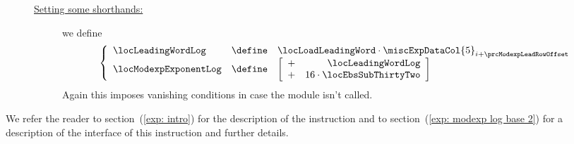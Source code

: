 \begin{description}
\begin{description}
\[						%
					\]
				\item[\underline{Setting some shorthands:}] 
					we define
					\[
						\left\{ \begin{array}{lcl}
							\locLeadingWordLog    & \define & \locLoadLeadingWord \cdot \miscExpDataCol{5}_{i + \prcModexpLeadRowOffset} \\
							\locModexpExponentLog & \define &
							\left[ \begin{array}{cr}
								+ & \locLeadingWordLog \\
								+ & 16 \cdot \locEbsSubThirtyTwo           \\
							\end{array} \right] \\
						\end{array} \right.
					\]
				\saNote{}
				Again this imposes vanishing conditions in case the \expMod{} module isn't called.
			\end{description}
		\end{description}
		\saNote{} We refer the reader to 
		section~(\ref{exp: intro}) for the description of the \expInstModexpLog{} instruction and to
		section~(\ref{exp: modexp log base 2}) for a description of the interface of this instruction and further details.

